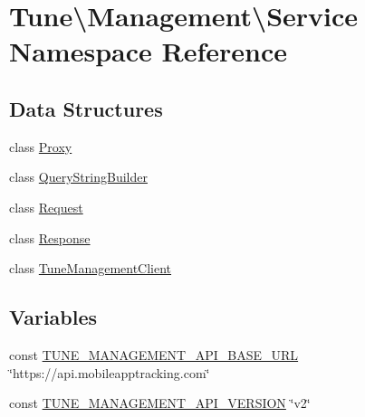 \hypertarget{namespaceTune_1_1Management_1_1Service}{\section{Tune\textbackslash{}Management\textbackslash{}Service Namespace Reference}
\label{namespaceTune_1_1Management_1_1Service}
}
\subsection*{Data Structures}
\begin{DoxyCompactItemize}
\item 
class \hyperlink{classTune_1_1Management_1_1Service_1_1Proxy}{Proxy}
\item 
class \hyperlink{classTune_1_1Management_1_1Service_1_1QueryStringBuilder}{Query\-String\-Builder}
\item 
class \hyperlink{classTune_1_1Management_1_1Service_1_1Request}{Request}
\item 
class \hyperlink{classTune_1_1Management_1_1Service_1_1Response}{Response}
\item 
class \hyperlink{classTune_1_1Management_1_1Service_1_1TuneManagementClient}{Tune\-Management\-Client}
\end{DoxyCompactItemize}
\subsection*{Variables}
\begin{DoxyCompactItemize}
\item 
const \hyperlink{namespaceTune_1_1Management_1_1Service_a7bce96e6c1888a8f3b18a9802d6a2ced}{T\-U\-N\-E\-\_\-\-M\-A\-N\-A\-G\-E\-M\-E\-N\-T\-\_\-\-A\-P\-I\-\_\-\-B\-A\-S\-E\-\_\-\-U\-R\-L} \char`\"{}https\-://api.\-mobileapptracking.\-com\char`\"{}
\item 
const \hyperlink{namespaceTune_1_1Management_1_1Service_a4a4f959118a3c1ce5c479805610f9036}{T\-U\-N\-E\-\_\-\-M\-A\-N\-A\-G\-E\-M\-E\-N\-T\-\_\-\-A\-P\-I\-\_\-\-V\-E\-R\-S\-I\-O\-N} \char`\"{}v2\char`\"{}
\end{DoxyCompactItemize}


